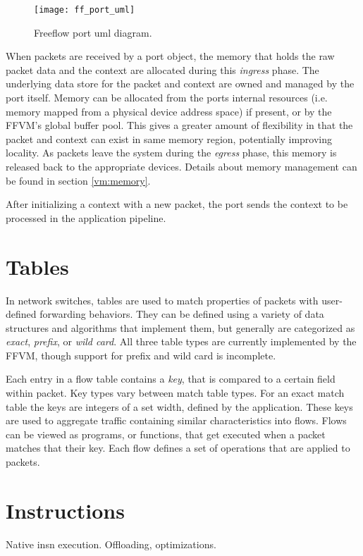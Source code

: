 \begin{figure}[h]
\centering
\texttt{[image: ff\_port\_uml]}
\caption{Freeflow port uml diagram.}
\label{port_uml}
\end{figure}

When packets are received by a port object, the memory that holds the raw
packet data and the context are allocated during this \emph{ingress} phase. The
underlying data store for the packet and context are owned and managed by the
port itself. Memory can be allocated from the ports internal resources (i.e.
memory mapped from a physical device address space) if present, or by the FFVM's
global buffer pool. This gives a greater amount of flexibility in that the
packet and context can exist in same memory region, potentially improving
locality. As packets leave the system during the \emph{egress} phase, this
memory is released back to the appropriate devices. Details about memory
management can be found in section \ref{vm:memory}.

After initializing a context with a new packet, the port sends the context to
be processed in the application pipeline.

\section{Tables}
\label{vm:tables}
In network switches, tables are used to match properties of packets
with user-defined forwarding behaviors. They can be defined using a variety of
data structures and algorithms that implement them, but generally are categorized
as \emph{exact}, \emph{prefix}, or \emph{wild card}. All three table types are
currently implemented by the FFVM, though support for prefix and wild card is
incomplete.


Each entry in a flow table contains a \emph{key}, that is compared to a
certain field within packet. Key types vary between match table types. For an
exact match table the keys are integers of a set width, defined by the
application. These keys are used to aggregate traffic containing similar
characteristics into flows. Flows can be viewed as programs, or functions,
that get executed when a packet matches that their key. Each flow defines a
set of operations that are applied to packets.


\section{Instructions}
\label{vm:insn}
Native insn execution. Offloading, optimizations.

